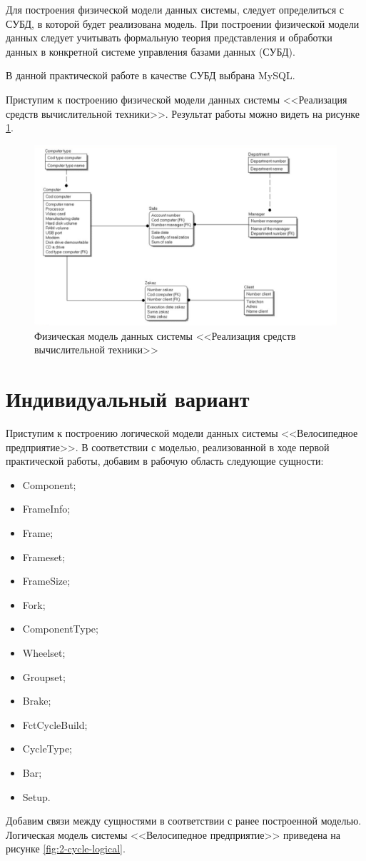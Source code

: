 \documentclass[a4paper,14pt]{extarticle}
\newcommand{\individual}{Индивидуальный вариант}
\begin{document}
Для построения физической модели данных системы, следует определиться с СУБД, в которой будет реализована модель. При построении физической модели данных следует учитывать формальную теория представления и обработки данных в конкретной системе управления базами данных (СУБД).

В данной практической работе в качестве СУБД выбрана MySQL.

Приступим к построению физической модели данных системы <<Реализация средств вычислительной техники>>. Результат работы можно видеть на рисунке \ref{fig:2-phisical-model}.

\begin{figure}[h!]
	\centering
	\includegraphics[width=0.7\linewidth]{images/2-phisical-model}
	\caption{Физическая модель данных системы <<Реализация средств вычислительной техники>>}
	\label{fig:2-phisical-model}
\end{figure}

\section{\individual}
Приступим к построению логической модели данных системы <<Велосипедное предприятие>>. 
В соответствии с моделью, реализованной в ходе первой практической работы, добавим в рабочую область следующие сущности:
\begin{itemize}
	\item Component;
	\item FrameInfo;
	\item Frame;
	\item Frameset;
	\item FrameSize;
	\item Fork;
	\item ComponentType;
	\item Wheelset;
	\item Groupset;
	\item Brake;
	\item FctCycleBuild;
	\item CycleType;
	\item Bar;
	\item Setup.
\end{itemize}
Добавим связи между сущностями в соответствии с ранее построенной моделью. Логическая модель системы <<Велосипедное предприятие>> приведена на рисунке \ref{fig:2-cycle-logical}.
\end{document}
